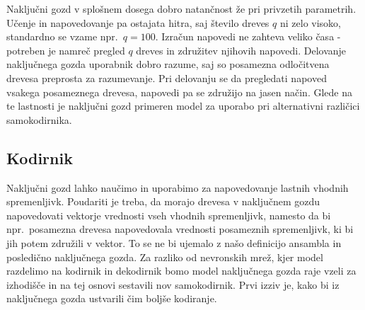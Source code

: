 \documentclass[12pt,a4paper,twoside]{article}
\theoremstyle{definition} %
\theoremstyle{plain} %
\numberwithin{equation}{section}  %
\begin{document}

Naključni gozd v splošnem dosega dobro natančnost že pri privzetih parametrih. 
Učenje in napovedovanje pa ostajata hitra, saj število dreves $q$ ni zelo visoko, standardno se vzame npr.\ $q = 100$. 
Izračun napovedi ne zahteva veliko časa - potreben je namreč pregled $q$ dreves in združitev njihovih napovedi. 
Delovanje naključnega gozda uporabnik dobro razume, saj so posamezna odločitvena drevesa preprosta za razumevanje.
Pri delovanju se da pregledati napoved vsakega posameznega drevesa, napovedi pa se združijo na jasen način. 
Glede na te lastnosti je naključni gozd primeren model za uporabo pri alternativni različici samokodirnika.



\subsection{Kodirnik}

Naključni gozd lahko naučimo in uporabimo za napovedovanje lastnih vhodnih spremenljivk. 
Poudariti je treba, da morajo drevesa v naključnem gozdu napovedovati vektorje vrednosti vseh vhodnih spremenljivk, namesto da bi npr.\ posamezna drevesa napovedovala vrednosti posameznih spremenljivk, ki bi jih potem združili v vektor.
To se ne bi ujemalo z našo definicijo ansambla in posledično naključnega gozda.
Za razliko od nevronskih mrež, kjer model razdelimo na kodirnik in dekodirnik bomo model naključnega gozda raje vzeli za izhodišče in na tej osnovi sestavili nov samokodirnik. 
Prvi izziv je, kako bi iz naključnega gozda ustvarili čim boljše kodiranje.
\end{document}
